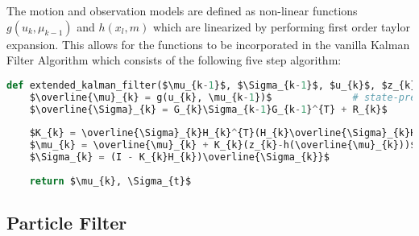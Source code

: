 The motion and observation models are defined as non-linear functions $  g(u_{k}, \mu_{k - 1}) $ and $ h(x_{l}, m) $ which are linearized by performing first order taylor expansion. This allows for the functions to be incorporated in the vanilla Kalman Filter Algorithm which consists of the following five step algorithm:



\begin{lstlisting}[mathescape=true, language=Python, caption={Kalman-filter algorithm described in pseude-code.},captionpos=b,label={lst:kalman_filter}]
	def extended_kalman_filter($\mu_{k-1}$, $\Sigma_{k-1}$, $u_{k}$, $z_{k}$):
	$\overline{\mu}_{k} = g(u_{k}, \mu_{k-1})$				# state-prediction given newest control measurements
	$\overline{\Sigma}_{k} = G_{k}\Sigma_{k-1}G_{k-1}^{T} + R_{k}$				# measurement prediction 	 		
	
	$K_{k} = \overline{\Sigma}_{k}H_{k}^{T}(H_{k}\overline{\Sigma}_{k}H_{k}^{T} + Q_{k})^{-1}$				# measurement of actual landmark position
	$\mu_{k} = \overline{\mu}_{k} + K_{k}(z_{k}-h(\overline{\mu}_{k}))$				# data association 
	$\Sigma_{k} = (I - K_{k}H_{k})\overline{\Sigma_{k}}$				# update of state-space vector as well as covariance matrix 
	
	return $\mu_{k}, \Sigma_{t}$
\end{lstlisting}






\subsection{Particle Filter}

